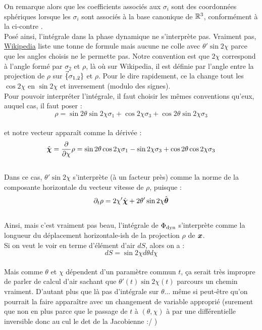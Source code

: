 On remarque alors que les coefficients associés aux $\sigma_i$ sont des coordonnées sphériques lorsque les $\sigma_i$ sont associés à la base canonique de $\R^3$, conformément à la  ci-contre .
\\
Posé ainsi, l'intégrale dans la phase dynamique ne s'interprète pas. Vraiment pas, \href{https://en.wikipedia.org/wiki/Spherical_coordinate_system#Integration_and_differentiation_in_spherical_coordinates}{Wikipedia} liste une tonne de formule mais aucune ne colle avec $\theta'\sin2\chi$ parce que les angles choisis ne le permette pas. 
Notre convention est que $2\chi$ correspond à l'angle formé par $\sigma_2$ et $\rho$, là où sur Wikipedia, il est définie par l'angle entre la projection de $\rho$ sur $\Vec\{\sigma_{1,2}\}$ et $\rho$. Pour le dire rapidement, ce la change tout les $\cos 2\chi$ en $\sin 2\chi$ et inversement (modulo des signes).
\\
Pour pouvoir interpréter l'intégrale, il faut choisir les mêmes conventions qu'eux, auquel cas, il faut poser :
\[\rho = \sin2\theta\sin2\chi \sigma_1 + \cos 2\chi \sigma_3 + \cos2\theta \sin2\chi \sigma_3\]
\\
et notre vecteur apparaît comme la dérivée :
\[\hat{\bf{\chi}} = \frac{\partial}{\partial\chi} \rho = \sin2\theta\cos2\chi \sigma_1 - \sin 2\chi \sigma_3 + \cos2\theta \cos2\chi \sigma_3\]
\\
Dans ce cas, $\theta'\sin2\chi$ s'interprète (à un facteur près) comme la norme de la composante horizontale du vecteur vitesse de $\rho$, puisque :
\[\partial_t\rho = 2 \chi'\hat{\bf{\chi}} + 2 \theta' \sin 2\chi \hat{\bf{\theta}}\]
\\
Ainsi, mais c'est vraiment pas beau, l'intégrale de $\phased$ s'interprète comme la longueur du déplacement horizontale-ish de la projection $\rho$ de $\x$.
\\
Si on veut le voir en terme d'élément d'air $dS$, alors on a :
\[dS = \sin2\chi d\theta d\chi\]
\\
Mais comme $\theta$ et $\chi$ dépendent d'un paramètre commun $t$, ça serait très impropre de parler de calcul d'air sachant que $\theta'(t)\sin 2\chi(t)$ parcours un chemin vraiment. D'autant plus que là pas d'intégrale sur $\theta$... même si peut-être qu'on pourrait la faire apparaître avec un changement de variable approprié (surement que non en plus parce que le passage de $t$ à $(\theta,\chi)$ à par une différentielle inversible donc au cul le det de la Jacobienne :/ )



